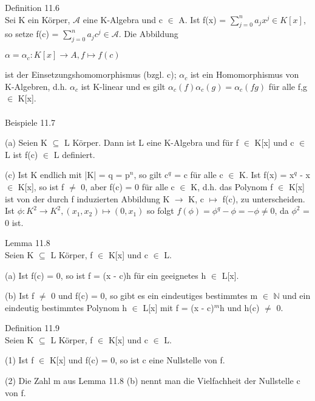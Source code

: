 Definition 11.6\\
Sei K ein Körper, $\mathcal{A}$ eine K-Algebra und c $\in$ A. Ist f(x) = $\sum\nolimits_{j=0}^{n} a_j x^j \in K[x]$, so setze f(c) = $\sum\nolimits_{j=0}^{n} a_j c^j \in \mathcal{A}$. Die Abbildung
\begin{center}
$\alpha = \alpha_c: K[x] \to A, f \mapsto f(c)$
\end{center}
ist der Einsetzungshomomorphismus (bzgl. c); $\alpha_c$ ist ein Homomorphismus von K-Algebren, d.h. $\alpha_c$ ist K-linear und es gilt $\alpha_c(f)\alpha_c(g) = \alpha_c(fg)$ für alle f,g $\in$ K[x].\\
\\
Beispiele 11.7
\begin{compactenum}
\item[(a)] Seien K $\subseteq$ L Körper. Dann ist L eine K-Algebra und für f $\in$ K[x] und c $\in$ L ist f(c) $\in$ L definiert.
\item[(c)] Ist K endlich mit |K| = q = p$^n$, so gilt c$^q$ = c für alle c $\in$ K. Ist f(x) = x$^q$ - x $\in$ K[x], so ist f $\neq$ 0, aber f(c) = 0 für alle c $\in$ K, d.h. das Polynom f $\in$ K[x] ist von der durch f induzierten Abbildung K $\to$ K, c $\mapsto$ f(c), zu unterscheiden. Ist $\phi: K^2 \to K^2, (x_1,x_2) \mapsto (0,x_1)$ so folgt $f(\phi) = \phi^q - \phi = -\phi \neq 0$, da $\phi^2$ = 0 ist.\\
\end{compactenum}
Lemma 11.8\\
Seien K $\subseteq$ L Körper, f $\in$ K[x] und c $\in$ L.
\begin{compactenum}
\item[(a)] Ist f(c) = 0, so ist f = (x - c)h für ein geeignetes h $\in$ L[x].
\item[(b)] Ist f $\neq$ 0 und f(c) = 0, so gibt es ein eindeutiges bestimmtes m $\in$ $\mathbb{N}$ und ein eindeutig bestimmtes Polynom h $\in$ L[x] mit f = (x - c)$^m$h und h(c) $\neq$ 0.\\
\end{compactenum}
Definition 11.9\\
Seien K $\subseteq$ L Körper, f $\in$ K[x] und c $\in$ L.
\begin{compactenum}
\item[(1)] Ist f $\in$ K[x] und f(c) = 0, so ist c eine Nullstelle von f.
\item[(2)] Die Zahl m aus Lemma 11.8 (b) nennt man die Vielfachheit der Nullstelle c von f.\\
\end{compactenum}
